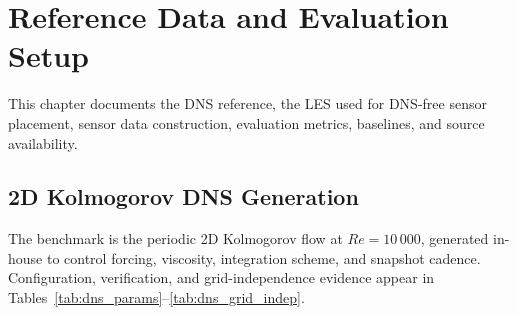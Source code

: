 \chapter{Reference Data and Evaluation Setup}
\label{ch:experiments_setup}

This chapter documents the DNS reference, the LES used for DNS-free sensor placement, sensor data construction, evaluation metrics, baselines, and source availability.

\section{2D Kolmogorov DNS Generation}
\label{sec:dns_generation}

The benchmark is the periodic 2D Kolmogorov flow at $Re=10\,000$, generated in-house to control forcing, viscosity, integration scheme, and snapshot cadence. Configuration, verification, and grid-independence evidence appear in Tables~\ref{tab:dns_params}--\ref{tab:dns_grid_indep}.

